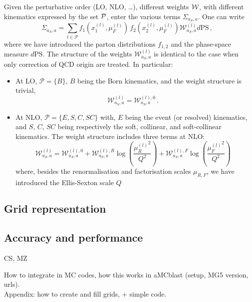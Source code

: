 Given the perturbative order (LO, NLO, \ldots), different weights $\cal W$, with different kinematics expressed by the set $\cal P$, enter the various
terms $\Sigma_{a_S, a}$. One can write
\begin{equation}
    \Sigma_{a_S, a}= \sum_{l\in \mathcal P} f_1(x_1^{(l)},\mu_F^{(l)}) \,f_2(x_2^{(l)},\mu_F^{(l)}) \mathcal W^{(l)}_{a_S, a}
    d \textrm{PS}\,,
\end{equation}
where we have introduced the parton distributions $f_{1,2}$ and the phase-space measure $d$PS. The structure of the weights $ \mathcal W^{(l)}_{a_S, a}$ is 
identical to the case when only correction of QCD origin are treated. In particular:
\begin{itemize}
    \item At LO, $\mathcal P = \{B\}$, $B$ being the Born kinematics, and the weight structure is trivial,
    \begin{equation}
        \mathcal W^{(l)}_{a_S, a} = {\mathcal W^{(l),0}_{a_S, a}}\,.
    \end{equation}
    \item At NLO, $\mathcal P = \{E, S, C, SC\}$ with, $E$ being the event (or resolved) kinematics, and $S$, $C$, $SC$ being
        respectively the soft, collinear, and soft-collinear kinematics. The weight structure includes three terms at NLO:
    \begin{equation}
        \mathcal W^{(l)}_{a_S, a} = {{\mathcal W}^{(l),0}_{a_S, a}} +
                                {\mathcal W^{(l),R}_{a_S, a}} \log\left(\frac{{\mu_R^{(l)}}^2}{Q^2}\right) +
                                {\mathcal W^{(l),F}_{a_S, a}} \log\left(\frac{{\mu_F^{(l)}}^2}{Q^2}\right)
    \end{equation}
    where, besides the renormalisation and factorisation scales $\mu_{R,F}$, we have introduced the Ellis-Sexton scale $Q$
\end{itemize}


\subsection{Grid representation}
\label{sec:grid-representation}

\subsection{Accuracy and performance}
\label{sec:accuracy-and-performance}

CS, MZ

How to integrate in MC codes, how this works in aMCblast (setup, MG5 version, urls).\\
Appendix: how to create and fill grids, + simple code.
